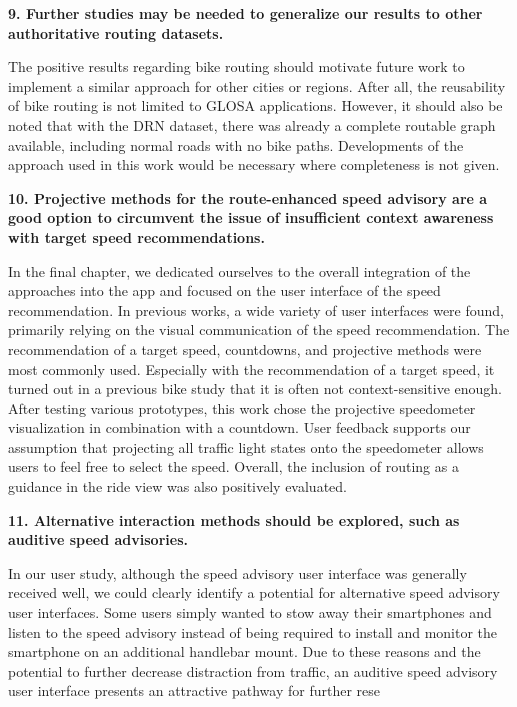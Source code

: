 \textbf{\color{cidarkblue}9. Further studies may be needed to generalize our results to other authoritative routing datasets.} 

The positive results regarding bike routing should motivate future work to implement a similar approach for other cities or regions. After all, the reusability of bike routing is not limited to GLOSA applications. However, it should also be noted that with the DRN dataset, there was already a complete routable graph available, including normal roads with no bike paths. Developments of the approach used in this work would be necessary where completeness is not given.

\textbf{\color{cidarkblue}10. Projective methods for the route-enhanced speed advisory are a good option to circumvent the issue of insufficient context awareness with target speed recommendations.} 

In the final chapter, we dedicated ourselves to the overall integration of the approaches into the app and focused on the user interface of the speed recommendation. In previous works, a wide variety of user interfaces were found, primarily relying on the visual communication of the speed recommendation. The recommendation of a target speed, countdowns, and projective methods were most commonly used. Especially with the recommendation of a target speed, it turned out in a previous bike study that it is often not context-sensitive enough. After testing various prototypes, this work chose the projective speedometer visualization in combination with a countdown. User feedback supports our assumption that projecting all traffic light states onto the speedometer allows users to feel free to select the speed. Overall, the inclusion of routing as a guidance in the ride view was also positively evaluated.

\textbf{\color{cidarkblue}11. Alternative interaction methods should be explored, such as auditive speed advisories.} 

In our user study, although the speed advisory user interface was generally received well, we could clearly identify a potential for alternative speed advisory user interfaces. Some users simply wanted to stow away their smartphones and listen to the speed advisory instead of being required to install and monitor the smartphone on an additional handlebar mount. Due to these reasons and the potential to further decrease distraction from traffic, an auditive speed advisory user interface presents an attractive pathway for further rese

